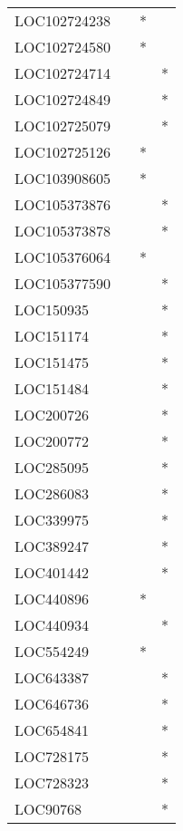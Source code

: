 \begin{longtable}{lccc}
LOC102724238   &           &   * &         \\
LOC102724580   &           &   * &         \\
LOC102724714   &           &     &       * \\
LOC102724849   &           &     &       * \\
LOC102725079   &           &     &       * \\
LOC102725126   &           &   * &         \\
LOC103908605   &           &   * &         \\
LOC105373876   &           &     &       * \\
LOC105373878   &           &     &       * \\
LOC105376064   &           &   * &         \\
LOC105377590   &           &     &       * \\
LOC150935      &           &     &       * \\
LOC151174      &           &     &       * \\
LOC151475      &           &     &       * \\
LOC151484      &           &     &       * \\
LOC200726      &           &     &       * \\
LOC200772      &           &     &       * \\
LOC285095      &           &     &       * \\
LOC286083      &           &     &       * \\
LOC339975      &           &     &       * \\
LOC389247      &           &     &       * \\
LOC401442      &           &     &       * \\
LOC440896      &           &   * &         \\
LOC440934      &           &     &       * \\
LOC554249      &           &   * &         \\
LOC643387      &           &     &       * \\
LOC646736      &           &     &       * \\
LOC654841      &           &     &       * \\
LOC728175      &           &     &       * \\
LOC728323      &           &     &       * \\
LOC90768       &           &     &       * \\

\end{longtable}
